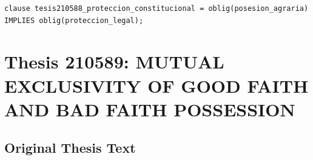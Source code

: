 \documentclass[11pt,a4paper]{article}
\begin{document}
\begin{lstlisting}[style=witnessstyle, language=Witness]
clause tesis210588_proteccion_constitucional = oblig(posesion_agraria) IMPLIES oblig(proteccion_legal);
\end{lstlisting}

\newpage

\section{Thesis 210589: MUTUAL EXCLUSIVITY OF GOOD FAITH AND BAD FAITH POSSESSION}
\label{thesis:210589}

\subsection{Original Thesis Text}
\end{document}
